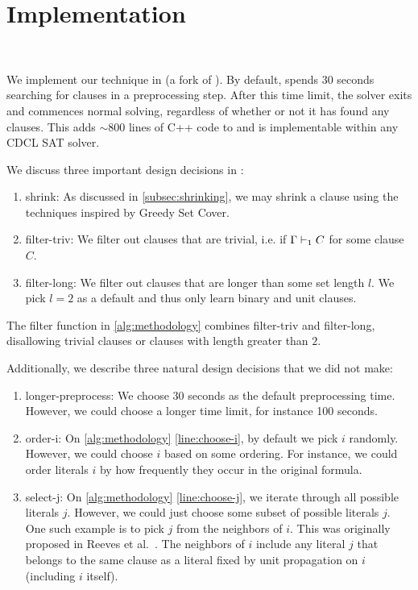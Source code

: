 \section{Implementation}~\label{sec:implementation}

We implement our technique in \tool (a fork of \cadical
). By default, \tool spends 30 seconds searching for \pr clauses in a preprocessing step. After this time limit, the solver exits and commences normal solving,
regardless of whether or not it has found any \pr clauses. This adds $\sim\!800$ lines
of C++ code to \cadical and is implementable within any CDCL SAT solver.

We discuss three important design decisions in \tool:

\begin{enumerate}
  \item \textsf{shrink}: As discussed in \autoref{subsec:shrinking}, we may
  shrink a clause using the techniques inspired by Greedy Set Cover.
  \item \textsf{filter-triv}: We filter out clauses that are trivial, i.e. if
  $\Gamma \vdash_1 C$ for some clause $C$.
  \item \textsf{filter-long}: We filter out clauses that are longer than some
  set length $l$. We pick $l = 2$ as a default and thus only learn binary and unit
  clauses.
\end{enumerate}

The filter function in \autoref{alg:methodology} combines \textsf{filter-triv} and \textsf{filter-long},
disallowing trivial clauses or clauses with length greater than $2$.

Additionally, we describe three natural design decisions that we did not make:

\begin{enumerate}
  \item \textsf{longer-preprocess}: We choose 30 seconds as the default
  preprocessing time. However, we could choose a longer time limit, for instance
  100 seconds.
  \item \textsf{order-i}: On \autoref{alg:methodology} \autoref{line:choose-i},
  by default we pick $i$ randomly. However, we could choose $i$ based
  on some ordering. For instance, we could order literals $i$ by how frequently
  they occur in the original formula.
  \item \textsf{select-j}: On \autoref{alg:methodology} \autoref{line:choose-j},
  we iterate through all possible literals $j$. However, we
  could just choose some subset of possible literals $j$. One such example is to pick $j$ from 
  the neighbors of $i$. This was originally proposed in Reeves et al.~\cite{prelearn}.
  The neighbors of $i$ include any literal $j$ that belongs to the same clause as
  a literal fixed by unit propagation on $i$ (including $i$ itself).
\end{enumerate}


